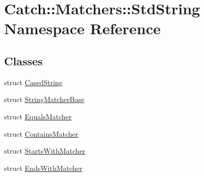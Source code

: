 \hypertarget{namespaceCatch_1_1Matchers_1_1StdString}{\section{Catch\-:\-:Matchers\-:\-:Std\-String Namespace Reference}
\label{namespaceCatch_1_1Matchers_1_1StdString}
}
\subsection*{Classes}
\begin{DoxyCompactItemize}
\item 
struct \hyperlink{structCatch_1_1Matchers_1_1StdString_1_1CasedString}{Cased\-String}
\item 
struct \hyperlink{structCatch_1_1Matchers_1_1StdString_1_1StringMatcherBase}{String\-Matcher\-Base}
\item 
struct \hyperlink{structCatch_1_1Matchers_1_1StdString_1_1EqualsMatcher}{Equals\-Matcher}
\item 
struct \hyperlink{structCatch_1_1Matchers_1_1StdString_1_1ContainsMatcher}{Contains\-Matcher}
\item 
struct \hyperlink{structCatch_1_1Matchers_1_1StdString_1_1StartsWithMatcher}{Starts\-With\-Matcher}
\item 
struct \hyperlink{structCatch_1_1Matchers_1_1StdString_1_1EndsWithMatcher}{Ends\-With\-Matcher}
\end{DoxyCompactItemize}
